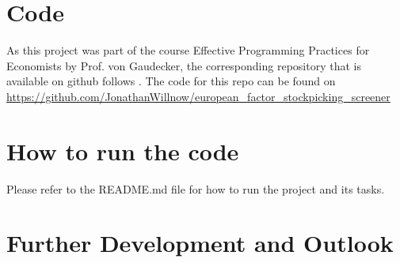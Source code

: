 \documentclass[11pt, a4paper, leqno]{article}
\begin{document}
\section{Code}
As this project was part of the course Effective Programming Practices for Economists by Prof. von Gaudecker, the corresponding repository 
that is available on github follows \citet{GaudeckerEconProjectTemplates}. 
The code for this repo can be found on \url{https://github.com/JonathanWillnow/european_factor_stockpicking_screener}

\section{How to run the code}
Please refer to the README.md file for how to run the project and its tasks.

\section{Further Development and Outlook}





\printbibliography
{}





\end{document}

